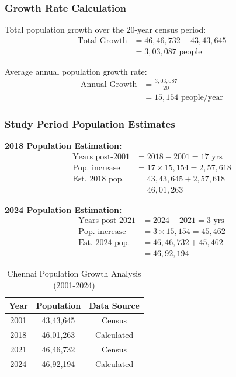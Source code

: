\documentclass[conference]{IEEEtran}
\begin{document}
\subsubsection{Growth Rate Calculation}
Total population growth over the 20-year census period:
\begin{align}
\text{Total Growth} &= 46,46,732 - 43,43,645 \nonumber \\ 
&= 3,03,087 \text{ people}
\end{align}

Average annual population growth rate:
\begin{align}
\text{Annual Growth} &= \frac{3,03,087}{20} \nonumber \\
&= 15,154 \text{ people/year}
\end{align}

\subsubsection{Study Period Population Estimates}
\textbf{2018 Population Estimation:}
\begin{align}
\text{Years post-2001} &= 2018 - 2001 = 17 \text{ yrs}\\
\text{Pop. increase} &= 17 \times 15,154 = 2,57,618\\
\text{Est. 2018 pop.} &= 43,43,645 + 2,57,618 \nonumber \\
&= 46,01,263
\end{align}

\textbf{2024 Population Estimation:}
\begin{align}
\text{Years post-2021} &= 2024 - 2021 = 3 \text{ yrs}\\
\text{Pop. increase} &= 3 \times 15,154 = 45,462\\
\text{Est. 2024 pop.} &= 46,46,732 + 45,462 \nonumber \\
&= 46,92,194
\end{align}

\begin{table}[htbp]
\renewcommand{\arraystretch}{1.3} %
\caption{Chennai Population Growth Analysis (2001-2024)}
\begin{center}
\begin{tabularx}{\columnwidth}{|C|C|C|}
\hline
\textbf{Year} & \textbf{Population} & \textbf{Data Source} \\
 & 43,43,645 & Census \\
 & 46,01,263 & Calculated \\
 & 46,46,732 & Census \\
 & 46,92,194 & Calculated \\
\hline
\end{tabularx}
\label{tab_population_data}
\end{center}
\end{table}
\end{document}
